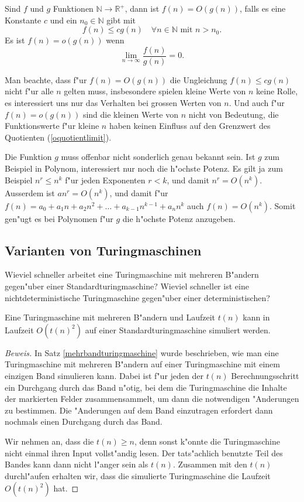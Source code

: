 \begin{definition}
Sind $f$ und $g$ Funktionen $\mathbb N\to\mathbb R^+$, dann ist
$f(n)=O(g(n))$, falls es eine Konstante $c$ und ein $n_0\in\mathbb N$
gibt mit
\[
f(n)\le cg(n)\quad \forall n\in\mathbb N\text{ mit } n > n_0.
\]
Es ist $f(n)=o(g(n))$ wenn 
\begin{equation}
\lim_{n\to\infty}\frac{f(n)}{g(n)}=0.
\label{oquotientlimit}
\end{equation}
\end{definition}
Man beachte, dass f"ur $f(n)=O(g(n))$ die Ungleichung $f(n)\le
cg(n)$ nicht f"ur alle $n$ gelten muss, insbesondere spielen kleine
Werte von $n$ keine Rolle, es interessiert uns nur das Verhalten
bei grossen Werten von $n$.
Und auch f"ur $f(n)=o(g(n))$ sind die kleinen Werte von $n$ nicht
von Bedeutung, die Funktionswerte f"ur kleine $n$ haben keinen
Einfluss auf den Grenzwert des Quotienten (\ref{oquotientlimit}).

Die Funktion $g$ muss offenbar nicht sonderlich genau bekannt
sein. Ist $g$ zum Beispiel in Polynom, interessiert nur noch
die h"ochste Potenz. Es gilt ja zum Beispiel
$ n^r\le n^k $ f"ur jeden Exponenten $r<k$, und damit
$n^r=O(n^k)$. Ausserdem ist $an^r=O(n^k)$, und damit
f"ur $f(n)=a_0+a_1n+a_2n^2+\dots+a_{k-1}n^{k-1}+a_nn^k$ auch
$ f(n)=O(n^k) $. Somit gen"ugt es bei Polynomen f"ur $g$ die
h"ochste Potenz anzugeben.

\subsection{Varianten von Turingmaschinen}
Wieviel schneller arbeitet eine Turingmaschine mit mehreren B"andern 
gegen"uber einer Standardturingmaschine? Wieviel schneller ist eine
nichtdeterministische Turingmaschine gegen"uber einer deterministischen?

\begin{satz}
Eine Turingmaschine mit mehreren B"andern und Laufzeit $t(n)$ kann
in Laufzeit $O(t(n)^2)$ auf einer Standardturingmaschine
simuliert werden.
\end{satz}

\begin{proof}[Beweis]
In Satz \ref{mehrbandturingmaschine} wurde beschrieben, wie man eine
Turingmaschine mit mehreren B"andern auf einer Turingmaschine mit
einem einzigen Band simulieren kann. Dabei ist f"ur jeden der
$t(n)$ Berechnungsschritt ein Durchgang durch das Band n"otig, bei
dem die Turingmaschine die Inhalte der markierten Felder zusammensammelt,
um dann die notwendigen "Anderungen zu bestimmen. Die "Anderungen
auf dem Band einzutragen erfordert dann nochmals einen Durchgang
durch das Band.

Wir nehmen an, dass die $t(n)\ge n$, denn sonst k"onnte die
Turingmaschine nicht einmal ihren Input vollst"andig lesen.
Der tats"achlich benutzte Teil des Bandes kann dann nicht l"anger sein
als $t(n)$. Zusammen mit den $t(n)$ durchl"aufen erhalten wir,
dass die simulierte Turingmaschine die Laufzeit $O(t(n)^2)$ hat.
\end{proof}


